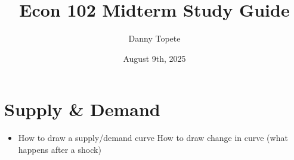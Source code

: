 \documentclass{article}
\title{Econ 102 Midterm Study Guide}
\author{Danny Topete}
\date{August 9th, 2025}
\begin{document}
\section{Supply \& Demand}
\begin{itemize}
  \item How to draw a supply/demand curve
    \ittem How to draw change in curve (what happens after a shock)
\end{itemize}
\end{document}
